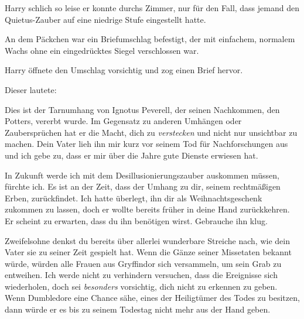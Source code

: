 Harry schlich so leise er konnte durchs Zimmer, nur für den Fall, dass jemand den Quietus-Zauber auf eine niedrige Stufe eingestellt hatte.

An dem Päckchen war ein Briefumschlag befestigt, der mit einfachem, normalem Wachs ohne ein eingedrücktes Siegel verschlossen war.

Harry öffnete den Umschlag vorsichtig und zog einen Brief hervor.

Dieser lautete:

\begin{writtenNote}
Dies ist der Tarnumhang von Ignotus Peverell, der seinen Nachkommen, den Potters, vererbt wurde. Im Gegensatz zu anderen Umhängen oder Zaubersprüchen hat er die Macht, dich zu \emph{verstecken} und nicht nur unsichtbar zu machen. Dein Vater lieh ihn mir kurz vor seinem Tod für Nachforschungen aus und ich gebe zu, dass er mir über die Jahre gute Dienste erwiesen hat.

In Zukunft werde ich mit dem Desillusionierungszauber auskommen müssen, fürchte ich. Es ist an der Zeit, dass der Umhang zu dir, seinem rechtmäßigen Erben, zurückfindet. Ich hatte überlegt, ihn dir als Weihnachtsgeschenk zukommen zu lassen, doch er wollte bereits früher in deine Hand zurückkehren. Er scheint zu erwarten, dass du ihn benötigen wirst. Gebrauche ihn klug.

Zweifelsohne denkst du bereits über allerlei wunderbare Streiche nach, wie dein Vater sie zu seiner Zeit gespielt hat. Wenn die Gänze seiner Missetaten bekannt würde, würden alle Frauen aus Gryffindor sich versammeln, um sein Grab zu entweihen. Ich werde nicht zu verhindern versuchen, dass die Ereignisse sich wiederholen, doch sei \emph{besonders} vorsichtig, dich nicht zu erkennen zu geben. Wenn Dumbledore eine Chance sähe, eines der Heiligtümer des Todes zu besitzen, dann würde er es bis zu seinem Todestag nicht mehr aus der Hand geben.


\end{writtenNote}

